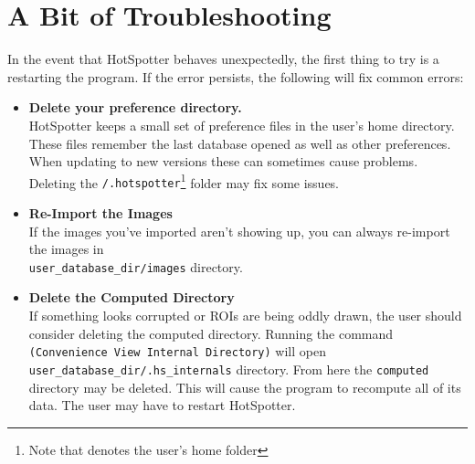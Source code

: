 \documentclass[a4paper,10pt]{article}
\begin{document}
\section{A Bit of Troubleshooting}

In the event that HotSpotter behaves unexpectedly, the first thing to try is a
restarting the program. If the error persists, the following will fix common
errors: 

\begin{itemize}
    \item \textbf{Delete your preference directory.}\\
        HotSpotter keeps a small set of preference files in the user's  home directory.
        These files remember the last database opened as well as other
        preferences. When updating to new versions these can sometimes cause
        problems. Deleting the {\tt \texttildelow/.hotspotter}\footnote{Note
            that {\tt \texttildelow} denotes the user's home folder} folder may fix some issues.\\

    \item \textbf{Re-Import the Images}\\
        If the images you've imported aren't showing up, you can always re-import
        the images in\\ {\tt user\_database\_dir/images} directory.\\

    \item \textbf{Delete the Computed Directory}\\
        If something looks corrupted or ROIs are being oddly drawn, the user
        should consider deleting the computed directory.  Running  the command 
        {\tt (Convenience \textrightarrow{} View Internal Directory)} will open
        {\tt user\_database\_dir/.hs\_internals} directory. From here the
        {\tt computed} directory may be deleted. This will cause the program
        to recompute all of its data. The user may have to restart HotSpotter.\\



\end{itemize}
\end{document}

